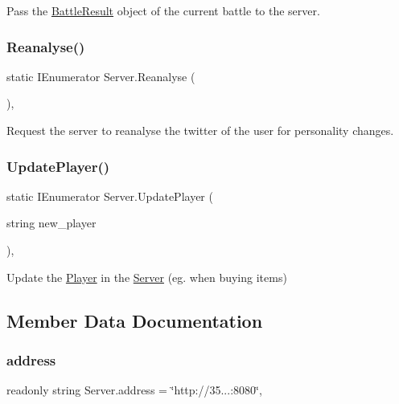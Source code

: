Pass the \mbox{\hyperlink{class_battle_result}{Battle\+Result}} object of the current battle to the server. 

\mbox{\label{class_server_ae77fb220463cc2e8a103b90aeb4e80bb}} 
\subsubsection{\texorpdfstring{Reanalyse()}{Reanalyse()}}
{\footnotesize\ttfamily static I\+Enumerator Server.\+Reanalyse (\begin{DoxyParamCaption}{ }\end{DoxyParamCaption})\hspace{0.3cm}{\ttfamily [inline]}, {\ttfamily [static]}}



Request the server to reanalyse the twitter of the user for personality changes. 

\mbox{\label{class_server_a80d81b83c802dfa2afd77f17dae0b28e}} 
\subsubsection{\texorpdfstring{UpdatePlayer()}{UpdatePlayer()}}
{\footnotesize\ttfamily static I\+Enumerator Server.\+Update\+Player (\begin{DoxyParamCaption}\item[{string}]{new\+\_\+player }\end{DoxyParamCaption})\hspace{0.3cm}{\ttfamily [inline]}, {\ttfamily [static]}}



Update the \mbox{\hyperlink{class_player}{Player}} in the \mbox{\hyperlink{class_server}{Server}} (eg. when buying items) 



\subsection{Member Data Documentation}
\mbox{\label{class_server_a4db3f96fe18261d12fd6eef5476aa69d}} 
\subsubsection{\texorpdfstring{address}{address}}
{\footnotesize\ttfamily readonly string Server.\+address = \char`\"{}http\+://35...\+:8080\char`\"{}\hspace{0.3cm}{\ttfamily [static]}, {\ttfamily [private]}}



